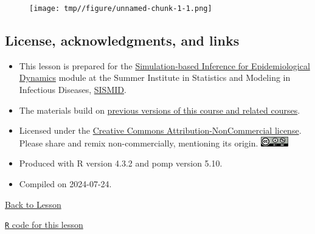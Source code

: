 \documentclass[
  letterpaper,
  DIV=11,
  numbers=noendperiod]{scrartcl}
\begin{document}
\framebreak

\begin{figure}[h!]

{\centering \texttt{[image: tmp//figure/unnamed-chunk-1-1.png]}

}

\end{figure}

\hypertarget{license-acknowledgments-and-links}{%
\subsection{License, acknowledgments, and
links}\label{license-acknowledgments-and-links}}

\begin{itemize}
\item
  This lesson is prepared for the
  \href{https://rubbislam.quarto.pub/episim/}{Simulation-based Inference
  for Epidemiological Dynamics} module at the Summer Institute in
  Statistics and Modeling in Infectious Diseases,
  \href{https://sph.emory.edu/SISMID/index.html}{SISMID}.
\item
  The materials build on \href{../acknowledge.html}{previous versions of
  this course and related courses}.
\item
  Licensed under the
  \href{https://creativecommons.org/licenses/by-nc/4.0/}{Creative
  Commons Attribution-NonCommercial license}. Please share and remix
  non-commercially, mentioning its origin.
  \includegraphics[height=12pt]{../graphics/cc-by-nc}
\item
  Produced with R version 4.3.2 and pomp version 5.10.
\item
  Compiled on 2024-07-24.
\end{itemize}

\vfill

\href{index.html}{Back to Lesson}

\href{./main.R}{\texttt{R} code for this lesson}
\end{document}

